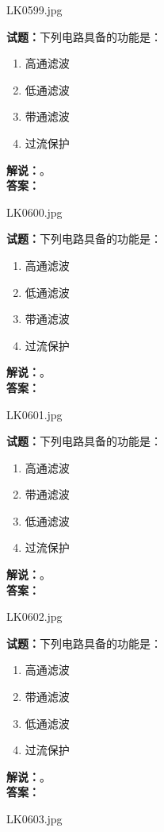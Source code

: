 \documentclass{ctexbook}
\begin{document}
LK0599.jpg


\noindent\textbf{试题：}下列电路具备的功能是：
\begin{enumerate}[leftmargin=3em]
\item 高通滤波
\item 低通滤波
\item 带通滤波
\item 过流保护
\end{enumerate}
\noindent\textbf{解说：}\textbf{}。\\\noindent\textbf{答案：}

\bigskip

LK0600.jpg


\noindent\textbf{试题：}下列电路具备的功能是：
\begin{enumerate}[leftmargin=3em]
\item 高通滤波
\item 低通滤波
\item 带通滤波
\item 过流保护
\end{enumerate}
\noindent\textbf{解说：}\textbf{}。\\\noindent\textbf{答案：}

\bigskip

LK0601.jpg


\noindent\textbf{试题：}下列电路具备的功能是：
\begin{enumerate}[leftmargin=3em]
\item 高通滤波
\item 带通滤波
\item 低通滤波
\item 过流保护
\end{enumerate}
\noindent\textbf{解说：}\textbf{}。\\\noindent\textbf{答案：}

\bigskip

LK0602.jpg


\noindent\textbf{试题：}下列电路具备的功能是：
\begin{enumerate}[leftmargin=3em]
\item 高通滤波
\item 带通滤波
\item 低通滤波
\item 过流保护
\end{enumerate}
\noindent\textbf{解说：}\textbf{}。\\\noindent\textbf{答案：}

\bigskip

LK0603.jpg
\end{document}
